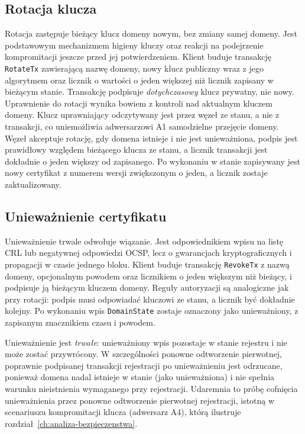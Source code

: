 \subsection{Rotacja klucza}
\label{subsec:rotacja}

Rotacja zastępuje bieżący klucz domeny nowym, bez zmiany samej domeny. Jest podstawowym mechanizmem higieny kluczy oraz reakcji na podejrzenie kompromitacji jeszcze przed jej potwierdzeniem. Klient buduje transakcję \texttt{RotateTx} zawierającą nazwę domeny, nowy klucz publiczny wraz z jego algorytmem oraz licznik o wartości o jeden większej niż licznik zapisany w bieżącym stanie. Transakcję podpisuje \emph{dotychczasowy} klucz prywatny, nie nowy. Uprawnienie do rotacji wynika bowiem z kontroli nad aktualnym kluczem domeny. Klucz uprawniający odczytywany jest przez węzeł ze stanu, a nie z transakcji, co uniemożliwia adwersarzowi A1 samodzielne przejęcie domeny. Węzeł akceptuje rotację, gdy domena istnieje i nie jest unieważniona, podpis jest prawidłowy względem bieżącego klucza ze stanu, a licznik transakcji jest dokładnie o jeden większy od zapisanego. Po wykonaniu w stanie zapisywany jest nowy certyfikat z numerem wersji zwiększonym o jeden, a licznik zostaje zaktualizowany.

\subsection{Unieważnienie certyfikatu}
\label{subsec:uniewaznienie}

Unieważnienie trwale odwołuje wiązanie. Jest odpowiednikiem wpisu na listę CRL lub negatywnej odpowiedzi OCSP, lecz o gwarancjach kryptograficznych i propagacji w czasie jednego bloku. Klient buduje transakcję \texttt{RevokeTx} z nazwą domeny, opcjonalnym powodem oraz licznikiem o jeden większym niż bieżący, i podpisuje ją bieżącym kluczem domeny. Reguły autoryzacji są analogiczne jak przy rotacji: podpis musi odpowiadać kluczowi ze stanu, a licznik być dokładnie kolejny. Po wykonaniu wpis \texttt{DomainState} zostaje oznaczony jako unieważniony, z zapisanym znacznikiem czasu i powodem.

Unieważnienie jest \emph{trwałe}: unieważniony wpis pozostaje w stanie rejestru i nie może zostać przywrócony. W szczególności ponowne odtworzenie pierwotnej, poprawnie podpisanej transakcji rejestracji po unieważnieniu jest odrzucane, ponieważ domena nadal istnieje w stanie (jako unieważniona) i nie spełnia warunku nieistnienia wymaganego przy rejestracji. Udaremnia to próbę cofnięcia unieważnienia przez ponowne odtworzenie pierwotnej rejestracji, istotną w scenariuszu kompromitacji klucza (adwersarz A4), którą ilustruje rozdział~\ref{ch:analiza-bezpieczenstwa}.

